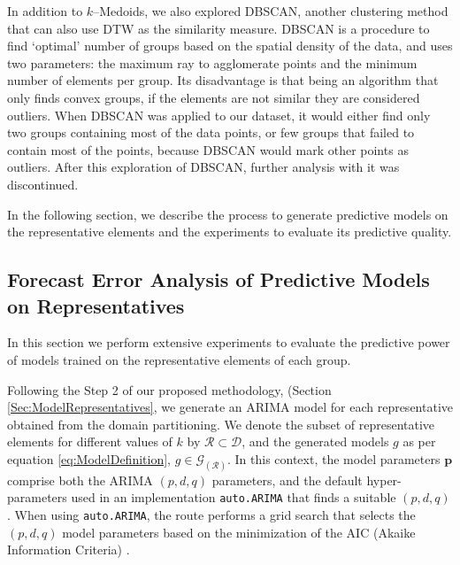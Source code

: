 
In addition to $k$--Medoids, we also explored DBSCAN, another clustering method that can also use DTW as the similarity measure. DBSCAN is a procedure to find `optimal' number of groups based on the spatial density of the data, and uses two parameters: the maximum ray to agglomerate points and the minimum number of elements per group. Its disadvantage is that being an algorithm that only finds convex groups, if the elements are not similar they are considered outliers. When DBSCAN was applied to our dataset, it would either find only two groups containing most of the data points, or few groups that failed to contain most of the points, because DBSCAN would mark other points as outliers. After this exploration of DBSCAN, further analysis with it was discontinued.

In the following section, we describe the process to generate predictive models on the representative elements and the experiments to evaluate its predictive quality.

\subsection{Forecast Error Analysis of Predictive Models on Representatives}
\label{Sec:AnalyzePredictorRepresentatives}

In this section we perform extensive experiments to evaluate the predictive power of models trained on the representative elements of each group. 

Following the Step 2 of our proposed methodology, (Section \ref{Sec:ModelRepresentatives}, we generate an ARIMA model for each representative obtained from the domain partitioning. We denote the subset of representative elements for different values of $k$ by $\mathcal{R} \subset \mathcal{D}$, and the generated models $g$ as per equation \ref{eq:ModelDefinition}, $g \in \mathcal{G}_{(\mathcal{R})}$. 
In this context, the model parameters $\mathbf{p}$ comprise both the ARIMA $(p, d, q)$ parameters, and the default hyper-parameters used in an implementation \texttt{auto.ARIMA} that finds a suitable $(p, d, q)$. When using \texttt{auto.ARIMA}, the route performs a grid search that selects the $(p, d, q)$ model parameters based on the minimization of the AIC (Akaike Information Criteria) \cite{Hyndman2008}.


